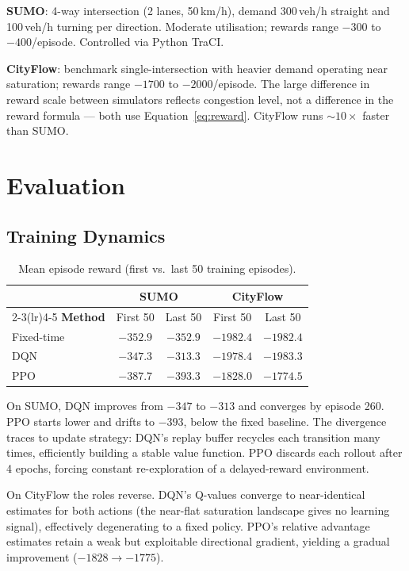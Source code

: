 \documentclass[10pt]{article}
\begin{document}
\textbf{SUMO}: 4-way intersection (2 lanes, 50\,km/h), demand 300\,veh/h
straight and 100\,veh/h turning per direction.  Moderate utilisation; rewards
range $-300$ to $-400$/episode.  Controlled via Python TraCI.

\textbf{CityFlow}: benchmark single-intersection with heavier demand operating
near saturation; rewards range $-1700$ to $-2000$/episode.  The large
difference in reward scale between simulators reflects congestion level, not a
difference in the reward formula — both use Equation~\ref{eq:reward}.
CityFlow runs ${\sim}10{\times}$ faster than SUMO.

\section{Evaluation}

\subsection{Training Dynamics}

\begin{table}[H]
\centering
\caption{Mean episode reward (first vs.\ last 50 training episodes).}
\label{tab:training}
\begin{tabular}{lcccc}
\toprule
 & \multicolumn{2}{c}{\textbf{SUMO}} & \multicolumn{2}{c}{\textbf{CityFlow}} \\
\cmidrule(lr){2-3}\cmidrule(lr){4-5}
\textbf{Method} & First 50 & Last 50 & First 50 & Last 50 \\
\midrule
Fixed-time & $-352.9$ & $-352.9$ & $-1982.4$ & $-1982.4$ \\
DQN        & $-347.3$ & $\mathbf{-313.3}$ & $-1978.4$ & $-1983.3$ \\
PPO        & $-387.7$ & $-393.3$ & $-1828.0$ & $\mathbf{-1774.5}$ \\
\bottomrule
\end{tabular}
\end{table}

On SUMO, DQN improves from $-347$ to $-313$ and converges by episode 260.
PPO starts lower and drifts to $-393$, below the fixed baseline.  The
divergence traces to update strategy: DQN's replay buffer recycles each
transition many times, efficiently building a stable value function.  PPO
discards each rollout after 4 epochs, forcing constant re-exploration of a
delayed-reward environment.

On CityFlow the roles reverse.  DQN's Q-values converge to near-identical
estimates for both actions (the near-flat saturation landscape gives no
learning signal), effectively degenerating to a fixed policy.  PPO's relative
advantage estimates retain a weak but exploitable directional gradient,
yielding a gradual improvement ($-1828 \to -1775$).
\end{document}
